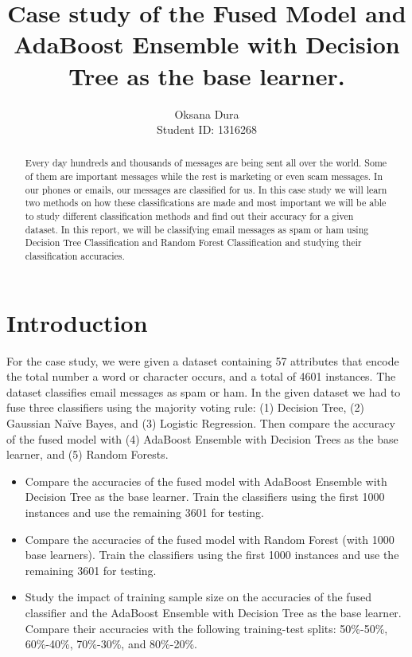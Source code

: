 \documentclass{article}
\title{Case study of the Fused Model and AdaBoost Ensemble with Decision Tree as the base learner. }
\author{Oksana Dura 
\\Student ID: 1316268}
\begin{document}
\maketitle

\begin{abstract}
Every day hundreds and thousands of messages are being sent all over the world. Some of them are important messages while the rest is marketing or even scam messages. In our phones or emails, our messages are classified for us. In this case study we will learn two methods on how these classifications are made and most important we will be able to study different classification methods and find out their accuracy for a given dataset. In this report, we will be classifying email messages as spam or ham using Decision Tree Classification and Random Forest Classification and studying their classification accuracies. 
    
\end{abstract}

\section{Introduction}

For the case study, we were given a dataset containing 57 attributes that encode the total number a word or character occurs, and a total of 4601 instances. The dataset classifies email messages as spam or ham. In the given dataset we had to fuse three classifiers using the majority voting rule: (1) Decision Tree, (2) Gaussian Naïve Bayes, and (3) Logistic Regression. Then compare the accuracy of the fused model with (4) AdaBoost Ensemble with Decision Trees as the base learner, and (5) Random Forests.

\begin{itemize}
  \item Compare the accuracies of the fused model with AdaBoost Ensemble with Decision Tree as the base learner. Train the classifiers using the first 1000 instances and use the remaining 3601 for testing.
  \item Compare the accuracies of the fused model with Random Forest (with 1000 base learners). Train the classifiers using the first 1000 instances and use the remaining 3601 for testing.
  \item Study the impact of training sample size on the accuracies of the fused classifier and the AdaBoost Ensemble with Decision Tree as the base learner. Compare their accuracies with the following training-test splits: 50\%-50\%, 60\%-40\%, 70\%-30\%, and 80\%-20\%. 
\end{itemize}
\end{document}
